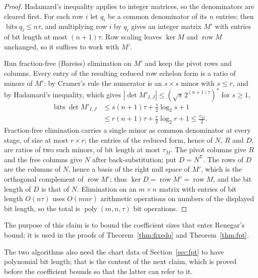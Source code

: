 \documentclass[journal]{IEEEtran}
\theoremstyle{plainn}
\theoremstyle{remark}
\begin{document}
\begin{proof}
Hadamard's inequality applies to integer matrices, so the denominators are cleared first. For each row
$i$ let $q_i$ be a common denominator of its $n$ entries; then $\operatorname{bits}q_i\le n\tau$, and
multiplying row $i$ by $q_i$ gives an integer matrix $M'$ with entries of bit length at most
$(n+1)\tau$. Row scaling leaves $\ker M$ and $\operatorname{row}M$ unchanged, so it suffices to work
with $M'$.

Run fraction-free (Bareiss) elimination on $M'$ and keep the pivot rows and columns. Every entry of the
resulting reduced row echelon form is a ratio of minors of $M'$: by Cramer's rule the numerator is an
$s\times s$ minor with $s\le r$, and by Hadamard's inequality, which gives
$|\det M'_{I,J}|\le(\sqrt s\,2^{(n+1)\tau})^{s}$ for $s\ge1$,
\begin{equation*}
\begin{aligned}
\operatorname{bits}\det M'_{I,J}
&\le s(n+1)\tau+\tfrac{s}{2}\log_2 s+1\\
&\le r(n+1)\tau+\tfrac{r}{2}\log_2 r+1\le\tfrac{\tau_M}{2}.
\end{aligned}
\end{equation*}
Fraction-free elimination carries a single minor as common denominator at every stage, of size at most
$r\times r$; the entries of the reduced form, hence of $N$, $R$ and $D$, are ratios of two such minors,
of bit length at most $\tau_M$. The pivot columns give $R$ and the free columns give $N$ after
back-substitution; put $D=N^{\mathsf T}$. The rows of $D$ are the columns of $N$, hence a basis of the
right null space of $M'$, which is the orthogonal complement of $\operatorname{row}M'$; thus
$\ker D=\operatorname{row}M'=\operatorname{row}M$, and the bit length of $D$ is that of $N$.
Elimination on an $m\times n$ matrix with entries of bit length $O(n\tau)$ uses $O(mnr)$ arithmetic
operations on numbers of the displayed bit length, so the total is $\operatorname{poly}(m,n,\tau)$ bit
operations.
\end{proof}

The purpose of this claim is to bound the coefficient sizes that enter Renegar's bound; it is used in the proofs of Theorem~\ref{thm:fixedq} and Theorem~\ref{thm:fpt}.

The two algorithms also need the chart data of Section~\ref{sec:fpt} to have polynomial bit length; that
is the content of the next claim, which is proved before the coefficient bounds so that the latter can
refer to it.
\end{document}
